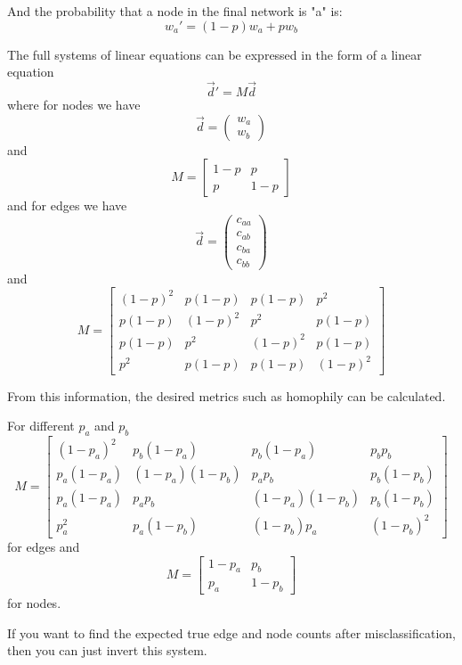 \documentclass[a4paper]{article}
\begin{document}
And the probability that a node in the final network is "a" is:
\begin{equation*}
w_a' = (1-p)w_a + pw_b
\end{equation*}

The full systems of linear equations can be expressed in the form of a linear equation
\begin{equation*}
\vec{d}' = M\vec{d}
\end{equation*}
where for nodes we have
\begin{equation*}
\vec{d} = \begin{pmatrix}w_a\\w_b\end{pmatrix}
\end{equation*}
and
\begin{equation}
M = \begin{bmatrix}
1-p & p\\
p & 1-p
\end{bmatrix}
\end{equation}
and for edges we have
\begin{equation*}
\vec{d} = \begin{pmatrix}c_{aa}\\c_{ab}\\c_{ba}\\c_{bb}\end{pmatrix}
\end{equation*}
and
\begin{equation} M =
\begin{bmatrix}
(1-p)^2 & p(1-p) & p(1-p) & p^2\\
p(1-p) & (1-p)^2 & p^2 & p(1-p)\\
p(1-p) & p^2 & (1-p)^2 & p(1-p)\\
p^2 & p(1-p) & p(1-p) & (1-p)^2
\end{bmatrix}
\end{equation}

From this information, the desired metrics such as homophily can be calculated.

For different $p_a$ and $p_b$
\begin{equation}M =
\begin{bmatrix}
(1-p_a)^2 & p_b(1-p_a) & p_b(1-p_a) & p_bp_b\\
p_a(1-p_a) & (1-p_a)(1-p_b) & p_ap_b & p_b(1-p_b)\\
p_a(1-p_a) & p_ap_b & (1-p_a)(1-p_b) & p_b(1-p_b)\\
p_a^2 & p_a(1-p_b) & (1-p_b)p_a & (1-p_b)^2
\end{bmatrix}
\end{equation}
for edges and
\begin{equation}
M = \begin{bmatrix}
1-p_a & p_b\\
p_a & 1-p_b
\end{bmatrix}
\end{equation}
for nodes.

If you want to find the expected true edge and node counts after misclassification, then you can just invert this system.


\end{document}
